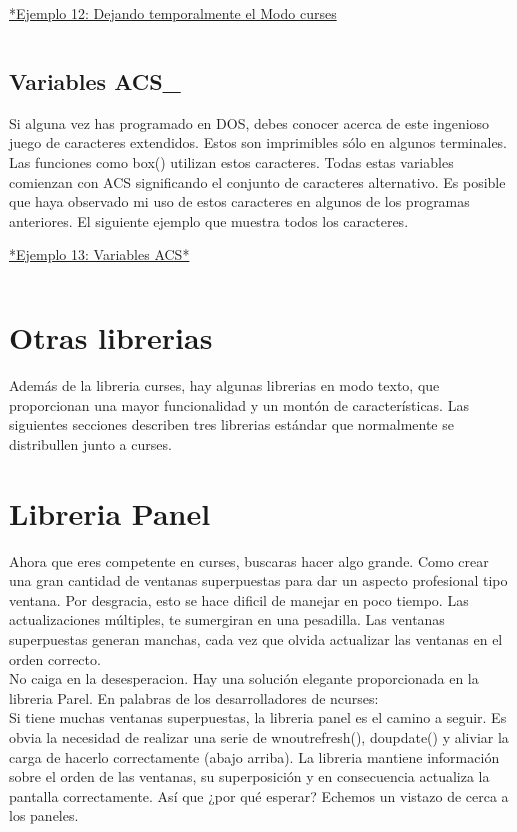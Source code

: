 \documentclass{article}
\begin{document}
\href{https://github.com/nasciiboy/NCURSES-Programming-HOWTO/blob/master/ncurses_programs/basics/temp_leave.c}{*Ejemplo 12: Dejando temporalmente el Modo curses}
\inputminted{cpp}{./cpp/012_dejando_temp_curses.cpp}

\subsection{Variables ACS\_}%
Si alguna vez has programado en DOS, debes conocer acerca de este ingenioso
juego de caracteres extendidos. Estos son imprimibles sólo en algunos
terminales. Las funciones como box() utilizan estos caracteres. Todas estas
variables comienzan con ACS significando el conjunto de caracteres alternativo.
Es posible que haya observado mi uso de estos caracteres en algunos de los
programas anteriores. El siguiente ejemplo que muestra todos los caracteres.

\href{https://github.com/nasciiboy/NCURSES-Programming-HOWTO/blob/master/ncurses_programs/basics/acs_vars.c}{*Ejemplo 13: Variables ACS*}
\inputminted{cpp}{./cpp/013_variables_ACS.cpp}

\section{Otras librerias}%
Además de la libreria curses, hay algunas librerias en modo texto, que
proporcionan una mayor funcionalidad y un montón de características. Las
siguientes secciones describen tres librerias estándar que normalmente se
distribullen junto a curses.

\section{Libreria Panel}%
Ahora que eres competente en curses, buscaras hacer algo grande. Como crear una
gran cantidad de ventanas superpuestas para dar un aspecto profesional tipo
ventana. Por desgracia, esto se hace dificil de manejar en poco tiempo. Las
actualizaciones múltiples, te sumergiran en una pesadilla. Las ventanas
superpuestas generan manchas, cada vez que olvida actualizar las ventanas en el
orden correcto.\\

No caiga en la desesperacion. Hay una solución elegante proporcionada en la
libreria Parel. En palabras de los desarrolladores de ncurses:\\

Si tiene muchas ventanas superpuestas, la libreria panel es el camino a seguir.
Es obvia la necesidad de realizar una serie de wnoutrefresh(), doupdate() y
aliviar la carga de hacerlo correctamente (abajo arriba). La libreria mantiene
información sobre el orden de las ventanas, su superposición y en consecuencia
actualiza la pantalla correctamente. Así que ¿por qué esperar? Echemos un
vistazo de cerca a los paneles.
\end{document}
